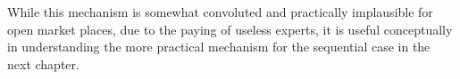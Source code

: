 While this mechanism is somewhat convoluted and practically implausible for open market places, due to the paying of useless experts, it is useful conceptually in understanding the more practical mechanism for the sequential case in the next chapter.







